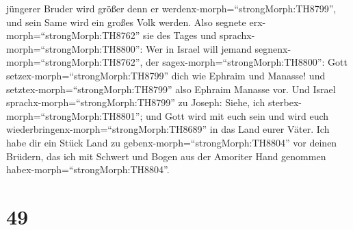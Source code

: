 jüngerer Bruder wird größer denn er
werdenx-morph=``strongMorph:TH8799'', und sein Same wird ein großes Volk
werden.  Also segnete erx-morph=``strongMorph:TH8762'' sie
des Tages und sprachx-morph=``strongMorph:TH8800'': Wer in Israel will
jemand segnenx-morph=``strongMorph:TH8762'', der
sagex-morph=``strongMorph:TH8800'': Gott
setzex-morph=``strongMorph:TH8799'' dich wie Ephraim und Manasse! und
setztex-morph=``strongMorph:TH8799'' also Ephraim Manasse vor.
 Und Israel sprachx-morph=``strongMorph:TH8799'' zu Joseph:
Siehe, ich sterbex-morph=``strongMorph:TH8801''; und Gott wird mit euch
sein und wird euch wiederbringenx-morph=``strongMorph:TH8689'' in das
Land eurer Väter.  Ich habe dir ein Stück Land zu
gebenx-morph=``strongMorph:TH8804'' vor deinen Brüdern, das ich mit
Schwert und Bogen aus der Amoriter Hand genommen
habex-morph=``strongMorph:TH8804''.

\hypertarget{section-48}{%
\section{49}\label{section-48}}

